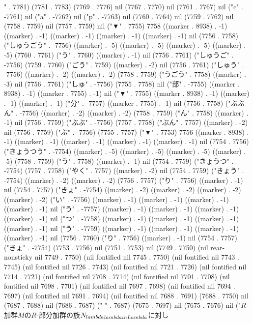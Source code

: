 {" . 7781) (7781 . 7783) (7769 . 7776) nil (7767 . 7770) nil (7761 . 7767) nil ("c" . -7761) nil ("a" . -7762) nil ("p" . -7763) nil (7760 . 7764) nil (7759 . 7762) nil (7758 . 7759) nil (7757 . 7759) nil ("▼" . 7755) 7758 ((marker . 8938) . -1) ((marker) . -1) ((marker) . -1) ((marker) . -1) ((marker) . -1) nil (7756 . 7758) ("しゅうごう" . -7756) ((marker) . -5) ((marker) . -5) ((marker) . -5) ((marker) . -5) (7760 . 7761) ("う" . 7760) ((marker) . -1) nil (7756 . 7761) ("しゅうご" . -7756) (7759 . 7760) ("ごう" . 7759) ((marker) . -2) nil (7756 . 7761) ("しゅう" . -7756) ((marker) . -2) ((marker) . -2) (7758 . 7759) ("うごう" . 7758) ((marker) . -3) nil (7756 . 7761) ("しゅ" . -7756) (7755 . 7758) nil ("部" . -7755) ((marker . 8938) . -1) ((marker . 7755) . -1) nil ("▼" . 7755) ((marker . 8938) . -1) ((marker) . -1) ((marker) . -1) ("分" . -7757) ((marker . 7755) . -1) nil (7756 . 7758) ("ぶぶん" . -7756) ((marker) . -2) ((marker) . -2) (7758 . 7759) ("ん" . 7758) ((marker) . -1) nil (7756 . 7759) ("ぶぶ" . -7756) (7757 . 7758) ("ぶん" . 7757) ((marker) . -2) nil (7756 . 7759) ("ぶ" . -7756) (7755 . 7757) ("▼" . 7753) 7756 ((marker . 8938) . -1) ((marker) . -1) ((marker) . -1) ((marker) . -1) ((marker) . -1) nil (7754 . 7756) ("きょうつう" . -7754) ((marker) . -5) ((marker) . -5) ((marker) . -5) ((marker) . -5) (7758 . 7759) ("う" . 7758) ((marker) . -1) nil (7754 . 7759) ("きょうつ" . -7754) (7757 . 7758) ("やく" . 7757) ((marker) . -2) nil (7754 . 7759) ("きょう" . -7754) ((marker) . -2) ((marker) . -2) (7756 . 7757) ("り" . 7756) ((marker) . -1) nil (7754 . 7757) ("きょ" . -7754) ((marker) . -2) ((marker) . -2) ((marker) . -2) ((marker) . -2) ("い" . -7756) ((marker) . -1) ((marker) . -1) ((marker) . -1) ((marker) . -1) nil ("う" . -7757) ((marker) . -1) ((marker) . -1) ((marker) . -1) ((marker) . -1) nil ("つ" . -7758) ((marker) . -1) ((marker) . -1) ((marker) . -1) ((marker) . -1) nil ("う" . -7759) ((marker) . -1) ((marker) . -1) ((marker) . -1) ((marker) . -1) nil (7756 . 7760) ("り" . 7756) ((marker) . -1) nil (7754 . 7757) ("きょ" . -7754) (7753 . 7756) nil (7751 . 7753) nil (7749 . 7750) (nil rear-nonsticky nil 7749 . 7750) (nil fontified nil 7745 . 7750) (nil fontified nil 7743 . 7745) (nil fontified nil 7726 . 7743) (nil fontified nil 7721 . 7726) (nil fontified nil 7714 . 7721) (nil fontified nil 7708 . 7714) (nil fontified nil 7701 . 7708) (nil fontified nil 7698 . 7701) (nil fontified nil 7697 . 7698) (nil fontified nil 7694 . 7697) (nil fontified nil 7691 . 7694) (nil fontified nil 7688 . 7691) (7688 . 7750) nil (7687 . 7688) nil (7686 . 7687) (" " . 7687) (7675 . 7697) nil (7675 . 7676) nil ("$R$-加群$M$の$R$-部分加群の族$\\{N_{\\lambda}\\}_{\\lambda\\in\\Lambda}$に対し
}
